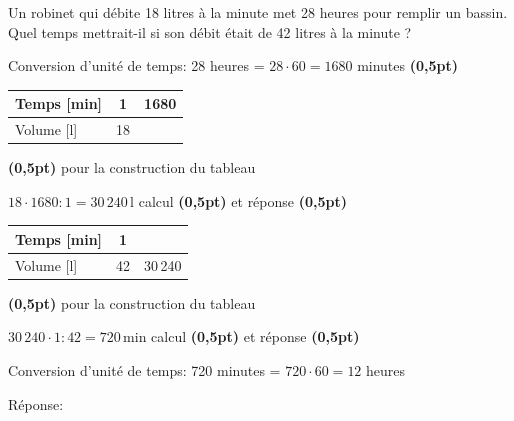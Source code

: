 
\question[4]
Un robinet qui débite 18 litres à la minute met 28 heures pour remplir un bassin. Quel temps mettrait-il si son débit était de 42 litres à la minute ?

\vspace{10pt}{\footnotesize\raggedleft Espace pour ta démarche et tes calculs\par}
\begin{solutionorgrid}[300pt]

\vspace{5pt}
Conversion d'unité de temps: 28 heures = $28 \cdot 60 = 1680$ minutes \hfill\textbf{(0,5pt)}

\vspace{5pt}
\def\arraystretch{1.5}
\begin{tabularx}{0.5\textwidth}{l|C|C|}
Temps [min]&1&1680\\
\hline
Volume [l]&18&\\
\end{tabularx}
\def\arraystretch{1}

\hfill\textbf{(0,5pt)} pour la construction du tableau

\vspace{15pt}$18 \cdot 1680 : 1 = 30\,240$\,l \hfill calcul \textbf{(0,5pt)} et réponse \textbf{(0,5pt)}

\vspace{20pt}
\def\arraystretch{1.5}
\begin{tabularx}{0.5\textwidth}{l|C|C|}
Temps [min]&1&\\
\hline
Volume [l]&42&30\,240\\
\end{tabularx}
\def\arraystretch{1}

\hfill\textbf{(0,5pt)} pour la construction du tableau

\vspace{15pt}$30\,240 \cdot 1 : 42 = 720$\,min \hfill calcul \textbf{(0,5pt)} et réponse \textbf{(0,5pt)}

\vspace{5pt}
Conversion d'unité de temps: 720 minutes = $720 \cdot 60 = 12$ heures
\end{solutionorgrid}

\begin{tcolorbox}[enhanced jigsaw, interior hidden, colframe=box, parbox=false]%
Réponse: 
\end{tcolorbox}



